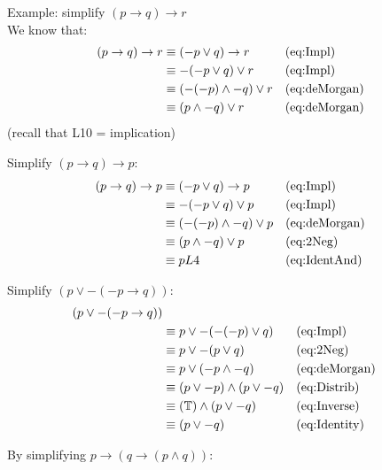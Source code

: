 Example: simplify $(p \to q) \to r$ \\
We know that:
\begin{align}
  (p \to q) \to r
    & \equiv (-p \lor q) \to r       && \text{(eq:Impl)}\\
    & \equiv -(-p \lor q) \lor r     && \text{(eq:Impl)}\\
    & \equiv (-(-p) \land -q) \lor r && \text{(eq:deMorgan)}\\
    & \equiv (p \land -q) \lor r     && \text{(eq:deMorgan)}\\
\end{align}
(recall that L10 = implication)

Simplify $(p \to q) \to p$:
\begin{align}
 (p \to q) \to p
   & \equiv (-p \lor q) \to p       && \text{(eq:Impl)}\\
   & \equiv -(-p \lor q) \lor p     && \text{(eq:Impl)}\\
   & \equiv (-(-p) \land -q) \lor p && \text{(eq:deMorgan)}\\
   & \equiv (p \land -q) \lor p     && \text{(eq:2Neg)}\\
   & \equiv p L4                    && \text{(eq:IdentAnd)}
\end{align}

Simplify $(p \lor -(-p \to q))$:
\begin{align}
  (p \lor -(-p \to q)) & \\
       & \equiv p \lor -(-(-p) \lor q)         && \text{(eq:Impl)}\\
       & \equiv p \lor -(p \lor q)             && \text{(eq:2Neg)}\\
       & \equiv p \lor (-p \land -q)           && \text{(eq:deMorgan)}\\
       & \equiv (p \lor -p) \land (p \lor -q)  && \text{(eq:Distrib)}\\
       & \equiv (\mathbb{T}) \land (p \lor -q) && \text{(eq:Inverse)}\\
       & \equiv (p \lor -q)                     && \text{(eq:Identity)}
\end{align}

By simplifying $p \to (q \to (p \land q)) $:

